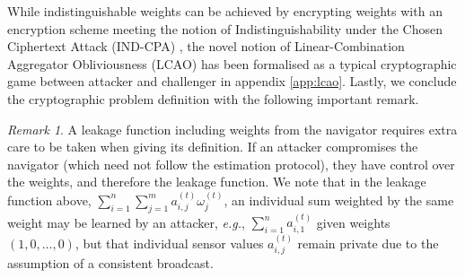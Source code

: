 \documentclass[10pt,letterpaper,oneside,twocolumn,journal]{IEEEtran}
\theoremstyle{definition}
\theoremstyle{definition}
\theoremstyle{remark}
\newtheorem*{remark}{Remark}
\begin{document}
While indistinguishable weights can be achieved by encrypting weights with an encryption scheme meeting the notion of Indistinguishability under the Chosen Ciphertext Attack (IND-CPA) \cite{katzIntroductionModernCryptography2008}, the novel notion of Linear-Combination Aggregator Obliviousness (LCAO) has been formalised as a typical cryptographic game between attacker and challenger in appendix \ref{app:lcao}. Lastly, we conclude the cryptographic problem definition with the following important remark.
\begin{remark} \label{rem:lcao_leakage}
    A leakage function including weights from the navigator requires extra care to be taken when giving its definition. If an attacker compromises the navigator (which need not follow the estimation protocol), they have control over the weights, and therefore the leakage function. We note that in the leakage function above, $\sum^n_{i=1}\sum^m_{j=1}a^{(t)}_{i,j}\omega^{(t)}_j$, an individual sum weighted by the same weight may be learned by an attacker, \textit{e.g.}, $\sum^n_{i=1}a^{(t)}_{i,1}$ given weights $(1,0,\dots,0)$, but that individual sensor values $a^{(t)}_{i,j}$ remain private due to the assumption of a consistent broadcast.
\end{remark}

% 
% 
\end{document}
